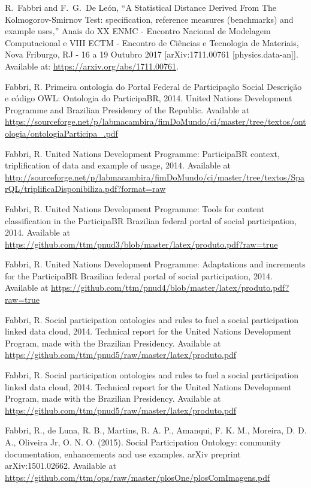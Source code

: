 \documentclass[letterpaper,10pt]{article}
\begin{document}
\begin{thebibliography}{99}
  R.~Fabbri and F.~G.~De León,
  ``A Statistical Distance Derived From The Kolmogorov-Smirnov Test: specification, reference measures (benchmarks) and example uses,''
  Anais do XX ENMC - Encontro Nacional de Modelagem Computacional e
  VIII ECTM - Encontro de Ci\^encias e Tecnologia de Materiais, Nova Friburgo,
  RJ - 16 a 19 Outubro 2017
		[arXiv:1711.00761 [physics.data-an]]. Available at: \url{https://arxiv.org/abs/1711.00761}.

	Fabbri, R. Primeira ontologia do Portal Federal de Participação Social Descrição e código OWL: Ontologia do ParticipaBR, 2014.
    United Nations Development Programme and Brazilian Presidency of the Republic. Available at \url{https://sourceforge.net/p/labmacambira/fimDoMundo/ci/master/tree/textos/ontologia/ontologiaParticipa\_.pdf}

    Fabbri, R. United Nations Development Programme: ParticipaBR context, triplification of data and example of usage, 2014.
    Available at \url{http://sourceforge.net/p/labmacambira/fimDoMundo/ci/master/tree/textos/SparQL/triplificaDisponibiliza.pdf?format=raw}

    Fabbri, R. United Nations Development Programme: Tools for content classification in the ParticipaBR Brazilian federal portal of social participation, 2014.
    Available at \url{https://github.com/ttm/pnud3/blob/master/latex/produto.pdf?raw=true}

    Fabbri, R. United Nations Development Programme: Adaptations and increments for the ParticipaBR Brazilian federal portal of social participation, 2014.
    Available at \url{https://github.com/ttm/pnud4/blob/master/latex/produto.pdf?raw=true}

Fabbri, R. Social participation ontologies and rules to fuel a social participation linked data cloud, 2014.
	Technical report for the United Nations Development Program, made with the Brazilian Presidency.
		Available at \url{https://github.com/ttm/pnud5/raw/master/latex/produto.pdf}

Fabbri, R. Social participation ontologies and rules to fuel a social participation linked data cloud, 2014.
	Technical report for the United Nations Development Program, made with the Brazilian Presidency.
		Available at \url{https://github.com/ttm/pnud5/raw/master/latex/produto.pdf}

	Fabbri, R., de Luna, R. B., Martins, R. A. P., Amanqui, F. K. M., Moreira, D. D. A., Oliveira Jr, O. N. O. (2015). Social Participation Ontology: community documentation, enhancements and use examples. arXiv preprint arXiv:1501.02662. Available at \url{https://github.com/ttm/ops/raw/master/plosOne/plosComImagens.pdf}


\end{thebibliography}
\end{document}
